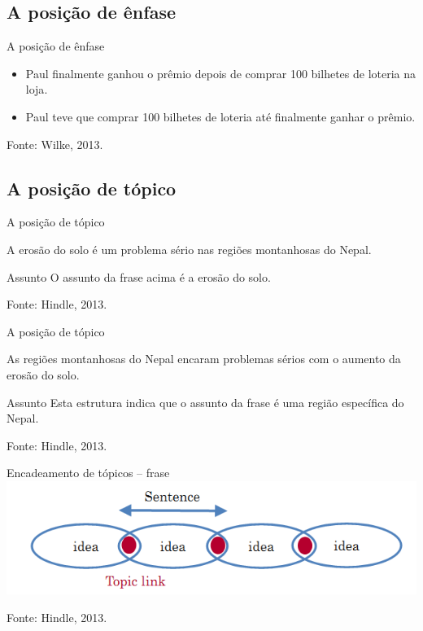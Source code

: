 \documentclass{beamer}
\begin{document}
\subsection{A posição de ênfase}

\begin{frame}{A posição de ênfase}
  \begin{example}
    \begin{itemize}
    \item Paul finalmente ganhou o prêmio depois de comprar 100
      bilhetes de loteria \alert<3->{na loja}.
    \item<4> Paul teve que comprar 100 bilhetes de loteria até finalmente
      \alert<5->{ganhar o prêmio}.
    \end{itemize}
  \end{example}

  \vfill
  Fonte: Wilke, 2013.
\end{frame}

\subsection{A posição de tópico}

\begin{frame}{A posição de tópico}
  \begin{example}
    A \alert<3->{erosão do solo} é um problema sério nas regiões
    montanhosas do Nepal.
  \end{example}
  \begin{block}{Assunto}
    O assunto da frase acima é a \alert<3->{erosão do solo}.
  \end{block}

  \vfill
  Fonte: Hindle, 2013.
\end{frame}

\begin{frame}{A posição de tópico}
  \begin{example}
    As \alert<3->{regiões montanhosas do Nepal} encaram problemas sérios com o
    aumento da erosão do solo.
  \end{example}
  \begin{block}{Assunto}
    Esta estrutura indica que o assunto da frase é \alert<3->{uma
      região específica} do Nepal.
  \end{block}

  \vfill
  Fonte: Hindle, 2013.
\end{frame}

\begin{frame}{Encadeamento de tópicos -- frase}
  \includegraphics[width=\textwidth]{Escrita/encadeamento1}

  \vfill
  Fonte: Hindle, 2013.
\end{frame}
\end{document}
